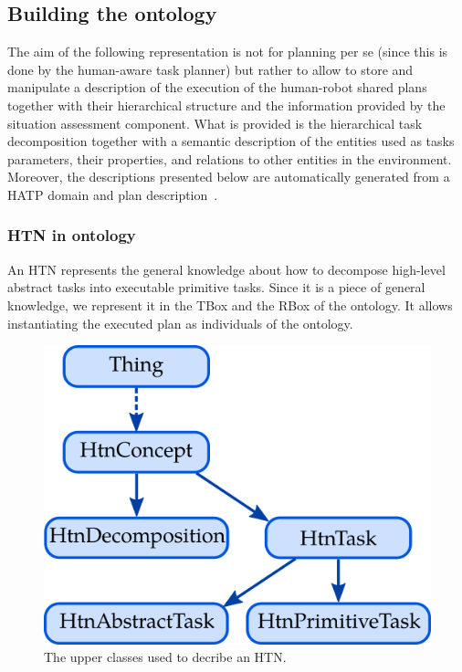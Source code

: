 \subsection{Building the ontology}

The aim of the following representation is not for planning per se (since this is done by the human-aware task planner) but rather to allow to store and manipulate a description of the execution of the human-robot shared plans together with their hierarchical structure and the information provided by the situation assessment component.
What is provided is the hierarchical task decomposition together with a semantic description of the entities used as tasks parameters, their properties, and relations to other entities in the environment. Moreover, the descriptions presented below are automatically generated from a HATP domain and plan description~\cite{lallement_2014_hatp}.

\subsubsection{HTN in ontology}

An HTN represents the general knowledge about how to decompose high-level abstract tasks into executable primitive tasks. Since it is a piece of general knowledge, we represent it in the TBox and the RBox of the ontology. It allows instantiating the executed plan as individuals of the ontology.

\begin{figure}[h!]
\centering
\includegraphics[scale=0.4]{figures/chapter6/tbox_base.png}
\caption{\label{fig:chap6_tbox_base} The upper classes used to decribe an HTN.}
\end{figure}

